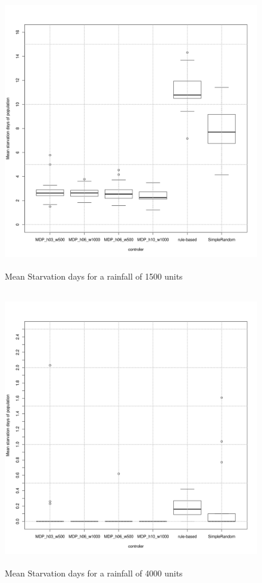 \documentclass[11pt,oneside,a4paper,openright]{report}
\begin{document}
\begin{figure}[!htb]
\centering
\includegraphics[height=12.2cm]{figures/expm/ecsi1_clim1500}
\caption{Mean Starvation days for a rainfall of 1500 units}
\label{fig:ecsi1_clim1500}
\end{figure}

\begin{figure}[!htb]
\centering
\includegraphics[height=12.2cm]{figures/expm/ecsi1_clim4000}
\caption{Mean Starvation days for a rainfall of 4000 units}
\label{fig:ecsi1_clim4000}
\end{figure}
\end{document}
